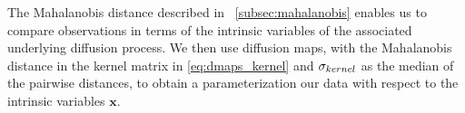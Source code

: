 The Mahalanobis distance described in \sec~\ref{subsec:mahalanobis} enables us to compare observations in terms of the intrinsic variables of the associated underlying diffusion process.
%
We then use diffusion maps, with the Mahalanobis distance in the kernel matrix in \eqref{eq:dmaps_kernel} and $\sigma_{kernel}$ as the median of the pairwise distances, to obtain a parameterization our data with respect to the intrinsic variables $\mathbf{x}$. 
%
%
%
